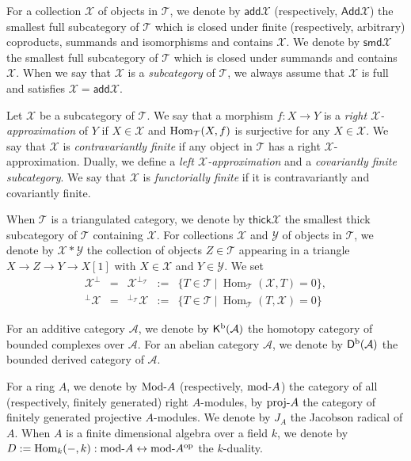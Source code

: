 \documentclass[a4paper,reqno]{amsart}
\theoremstyle{definition}
\newcommand{\Mod}[1]{{\rm{Mod}}\text{-}#1} %
\newcommand{\TT}{{\mathcal T}}
\newcommand{\XX}{{\mathcal X}}
\newcommand{\YY}{{\mathcal Y}}
\newcommand{\add}{\mathsf{add}}
\newcommand{\Add}{\mathsf{Add}}
\newcommand{\summand}{\mathsf{smd}}
\newcommand{\thick}{\mathsf{thick}}
\newcommand{\Hom}{\operatorname{Hom}\nolimits}
\newcommand{\modu}[1]{{\rm{mod}}\text{-}#1} %
\newcommand{\proj}[1]{{\rm{proj}}\text{-}#1} %
\newcommand{\homo}[3]{{\rm{Hom}}_{#1}(#2, #3)} %
\newcommand{\fl}[1]{{\rm{f.l}}\text{-}#1} %
\newcommand{\K}{\mathsf{K}}
\newcommand{\D}{\mathsf{D}}
\renewcommand{\AA}{{\mathcal A}}
\begin{document}
For a collection $\XX$ of objects in $\TT$,
we denote by $\add\XX$ (respectively, $\Add\XX$) the smallest full subcategory of $\TT$
which is closed under finite (respectively, arbitrary) coproducts, summands and isomorphisms
and contains $\XX$.
We denote by $\summand\XX$ the smallest full subcategory of $\TT$ which is closed under summands and contains $\XX$.
When we say that $\XX$ is a \emph{subcategory} of $\TT$, we always assume that
$\XX$ is full and satisfies $\XX=\add\XX$.

Let $\XX$ be a subcategory of $\TT$.
We say that a morphism $f:X\to Y$ is a \emph{right $\XX$-approximation} of $Y$ 
if $X\in \XX$ and $\homo{\TT}{X}{f}$ is surjective for any $X\in \XX$. 
We say that $\XX$ is \emph{contravariantly finite} if any object in $\TT$ has a right $\XX$-approximation. 
Dually, we define a \emph{left $\XX$-approximation} and a \emph{covariantly finite subcategory}. 
We say that $\XX$ is \emph{functorially finite} if it is contravariantly and covariantly finite. 

When $\TT$ is a triangulated category, we denote by $\thick\XX$ the smallest thick subcategory of $\TT$ containing $\XX$.
For collections $\XX$ and $\YY$ of objects in $\TT$, we denote by
$\XX*\YY$ the collection of objects $Z\in\TT$ appearing in a triangle
$X\to Z\to Y\to X[1]$ with $X\in\XX$ and $Y\in\YY$.
We set
\[\begin{array}{ccccc}
\XX^\perp   &=& \XX^{\perp_{\TT}} &:=& \{T\in \TT\ |\ \Hom_{\TT}(\XX,T)=0\},\\
{}^\perp\XX &=& {}^{\perp_{\TT}}\XX &:=& \{T\in \TT\ |\ \Hom_{\TT}(T,\XX)=0\}
\end{array}\]

For an additive category $\AA$, we denote by $\K^{\rm b}(\AA)$ the homotopy
category of bounded complexes over $\AA$.
For an abelian category $\AA$, we denote by $\D^{\rm b}(\AA)$ the bounded
derived category of $\AA$.

For a ring $A$, we denote by $\Mod A$ (respectively, $\modu A$) the category
of all (respectively, finitely generated) right $A$-modules,
by $\proj A$ the category of finitely generated projective $A$-modules.
We denote by $J_A$ the Jacobson radical of $A$.
When $A$ is a finite dimensional algebra over a field $k$,
we denote by $D:=\Hom_k(-,k):\modu A\leftrightarrow\modu A^{\rm op}$ the $k$-duality.
\end{document}
